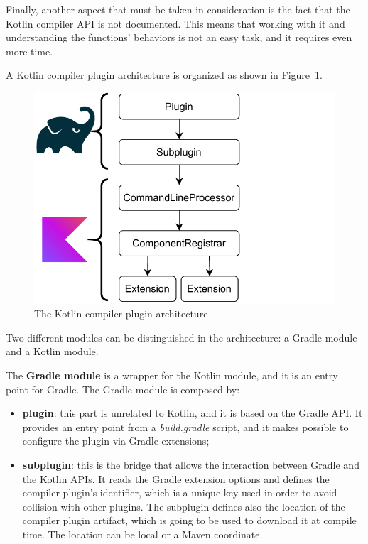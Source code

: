 Finally, another aspect that must be taken in consideration is the fact that the Kotlin compiler API is not documented. This means that working with it and understanding the functions' behaviors is not an easy task, and it requires even more time.

A Kotlin compiler plugin architecture is organized as shown in Figure~\ref{fig:kotlin_compiler_plugin_architecture}.

\begin{figure}[!ht]
    \centering
    \includegraphics[scale=1]{document/chapters/2-metaprogramming/images/kotlin_compiler_plugin_architecture.pdf}
    \caption{The Kotlin compiler plugin architecture~\cite{compiler_plugins_jetbrains}}
    \label{fig:kotlin_compiler_plugin_architecture}
\end{figure}

Two different modules can be distinguished in the architecture: a Gradle module and a Kotlin module.

The \textbf{Gradle module} is a wrapper for the Kotlin module, and it is an entry point for Gradle. The Gradle module is composed by:
\begin{itemize}
    \item \textbf{plugin}: this part is unrelated to Kotlin, and it is based on the Gradle API. It provides an entry point from a \textit{build.gradle} script, and it makes possible to configure the plugin via Gradle extensions;
    \item \textbf{subplugin}: this is the bridge that allows the interaction between Gradle and the Kotlin APIs. It reads the Gradle extension options and defines the compiler plugin's identifier, which is a unique key used in order to avoid collision with other plugins. The subplugin defines also the location of the compiler plugin artifact, which is going to be used to download it at compile time. The location can be local or a Maven coordinate.
\end{itemize}

